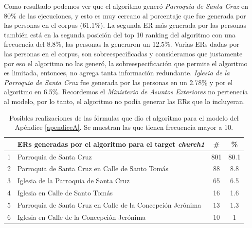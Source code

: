 Como resultado podemos ver que el algoritmo gener\'o {\it Parroquia de Santa Cruz} en 80\% de las ejecuciones, y esto es muy cercano al porcentaje que fue generada por las personas en el corpus (61.1\%). La segunda ER m\'as generada por las personas tambi\'en est\'a en la segunda posici\'on del top 10 ranking del algoritmo con una frecuencia del 8.8\%, las personas la generaron un 12.5\%. Varias ERs dadas por las personas en el corpus, son sobreespecificadas y consideramos que justamente por eso el algoritmo no las gener\'o, la sobreespecificaci\'on que permite el algoritmo es limitada, entonces, no agrega tanta informaci\'on redundante. {\it Iglesia de la Parroquia de Santa Cruz} fue generada por las personas en un 2.78\% y por el algoritmo en 6.5\%. Recordemos el {\it Ministerio de Asuntos Exteriores} no pertenec\'ia al modelo, por lo tanto, el algoritmo no pod\'ia generar las ERs que lo incluyeran.
\begin{table}[h]
\begin{center}
\begin{tabular}{|l|l|c|c|}
\hline
&ERs generadas por el algoritmo para el target {\it church1} &  \# &\% \\ \hline \hline
1& Parroquia de Santa Cruz& 801&80.1\\ \hline
2& Parroquia de Santa Cruz en Calle de Santo Tom\'as& 88&8.8\\ \hline
3& Iglesia de la Parroquia de Santa Cruz& 65&6.5\\ \hline
4& Iglesia en Calle de Santo Tom\'as&16&1.6\\ \hline
5& Parroquia de Santa Cruz en Calle de la Concepci\'on Jer\'onima& 13&1.3\\ \hline
6& Iglesia en Calle de la Concepci\'on Jer\'onima &10&1\\ \hline


\end{tabular}

\caption{Posibles realizaciones de las f\'ormulas que dio el algoritmo para el modelo del Ap\'endice \protect\ref{apendiceA}. Se muestran las que tienen frecuencia mayor a 10.}\label{formulas-mapa-zoom2x}
\end{center}
\end{table}

